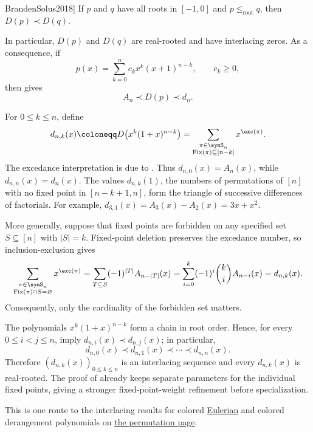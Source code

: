 \begin{theorem}[Brändén--Solus, \cite[Thm.~3.6]{BrandenSolus2018}]
If $p$ and $q$ have all roots in $[-1,0]$ and $p \leq_{\mathrm{root}} q$, then
$D(p) \prec D(q)$.
\end{theorem}

In particular, $D(p)$ and $D(q)$ are real-rooted and have interlacing zeros.
As a consequence, if
\[
 p(x)=\sum_{k=0}^n c_k x^k (x+1)^{n-k}, \qquad c_k \geq 0,
\]
then \cite[Cor.~3.7]{BrandenSolus2018} gives
\[
 A_n \prec D(p) \prec d_n.
\]

For $0\leq k\leq n$, define
\[
 d_{n,k}(x)
 \coloneqq D\bigl(x^k(1+x)^{n-k}\bigr)
 =\sum_{\substack{\pi\in\symS_n\\
                   \operatorname{Fix}(\pi)\subseteq[n-k]}}
    x^{\exc(\pi)}.
\]
The excedance interpretation is due to 
\cite[Prop.~4.1(a)]{Athanasiadis2025EulerianTransformation}.  Thus
$d_{n,0}(x)=A_n(x)$, while $d_{n,n}(x)=d_n(x)$.  The values $d_{n,k}(1)$,
the numbers of permutations of $[n]$ with no fixed point in $[n-k+1,n]$,
form the triangle  of successive differences of factorials.
For example, $d_{3,1}(x)=A_3(x)-A_2(x)=3x+x^2$.

More generally, suppose that fixed points are forbidden on any specified set
$S\subseteq[n]$ with $|S|=k$.  Fixed-point deletion preserves the excedance
number, so inclusion-exclusion gives
\[
 \sum_{\substack{\pi\in\symS_n\\
                  \operatorname{Fix}(\pi)\cap S=\varnothing}}
 x^{\exc(\pi)}
 =\sum_{T\subseteq S}(-1)^{|T|}A_{n-|T|}(x)
 =\sum_{i=0}^k(-1)^i\binom{k}{i}A_{n-i}(x)
 =d_{n,k}(x).
\]
Consequently, only the cardinality of the forbidden set matters.

The polynomials $x^k(1+x)^{n-k}$ form a chain in root order.  Hence, for
every $0\leq i<j\leq n$, \cite[Thm.~3.6 and Cor.~3.7]{BrandenSolus2018}
imply $d_{n,i}(x)\prec d_{n,j}(x)$; in particular,
\[
 d_{n,0}(x)\prec d_{n,1}(x)\prec\dotsb\prec d_{n,n}(x).
\]
Therefore $(d_{n,k}(x))_{0\leq k\leq n}$ is an interlacing sequence and
every $d_{n,k}(x)$ is real-rooted.  The proof of
\cite[Lem.~3.5]{BrandenSolus2018} already keeps separate parameters for the
individual fixed points, giving a stronger fixed-point-weight refinement
before specialization.

This is one route to the interlacing results for colored
\hyperref[eulerianZeros]{Eulerian} and colored derangement polynomials on
\hyperref[realRootedWords]{the permutation page}.

